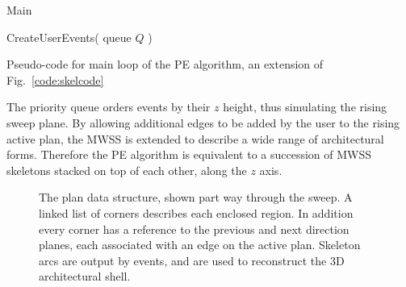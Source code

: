 \begin{algorithm} [htb]
\begin{footnotesize}
  Main 

  CreateUserEvents( queue $Q$ ) 

\end{footnotesize}
  \caption[PE pseudocode]{Pseudo-code for main loop of the PE algorithm, an extension of Fig.~\ref{code:skelcode}}
  \label{code:pecode}
\end{algorithm}

The priority queue orders events by their $z$ height, thus simulating the rising sweep plane. By allowing additional edges to be added by the user to the rising active plan, the MWSS is extended to describe a wide range of architectural forms. Therefore the PE algorithm is equivalent to a succession of MWSS skeletons stacked on top of each other, along the $z$ axis. 

\begin{figure}
  \centering
  \def\svgwidth{0.7\columnwidth}
  
  \caption[PE algorithm pointers]{\label{fig:pointers}
 The plan data structure, shown part way through the sweep. A linked list of corners describes each enclosed region. In addition every corner has a reference to the previous and next direction planes, each associated with an edge on the active plan. Skeleton arcs are output by events, and are used to reconstruct the 3D architectural shell.}
\end{figure}

